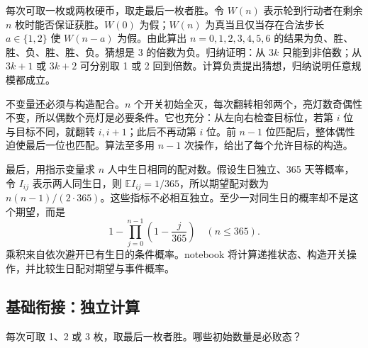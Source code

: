 每次可取一枚或两枚硬币，取走最后一枚者胜。令 $W(n)$ 表示轮到行动者在剩余 $n$ 枚时能否保证获胜。$W(0)$ 为假；$W(n)$ 为真当且仅当存在合法步长 $a\in\{1,2\}$ 使 $W(n-a)$ 为假。由此算出 $n=0,1,2,3,4,5,6$ 的结果为负、胜、胜、负、胜、胜、负。猜想是 $3$ 的倍数为负。归纳证明：从 $3k$ 只能到非倍数；从 $3k+1$ 或 $3k+2$ 可分别取 1 或 2 回到倍数。计算负责提出猜想，归纳说明任意规模都成立。

不变量还必须与构造配合。$n$ 个开关初始全灭，每次翻转相邻两个，亮灯数奇偶性不变，所以偶数个亮灯是必要条件。它也充分：从左向右检查目标位，若第 $i$ 位与目标不同，就翻转 $i,i+1$；此后不再动第 $i$ 位。前 $n-1$ 位匹配后，整体偶性迫使最后一位也匹配。算法至多用 $n-1$ 次操作，给出了每个允许目标的构造。

最后，用指示变量求 $n$ 人中生日相同的配对数。假设生日独立、365 天等概率，令 $I_{ij}$ 表示两人同生日，则 $\mathbb EI_{ij}=1/365$，所以期望配对数为 $n(n-1)/(2\cdot365)$。这些指标不必相互独立。至少一对同生日的概率却不是这个期望，而是
\[
 1-\prod_{j=0}^{n-1}\left(1-\frac j{365}\right)\quad(n\leq365).
\]
乘积来自依次避开已有生日的条件概率。notebook 将计算递推状态、构造开关操作，并比较生日配对期望与事件概率。


\subsection*{基础衔接：独立计算}
每次可取 1、2 或 3 枚，取最后一枚者胜。哪些初始数量是必败态？
